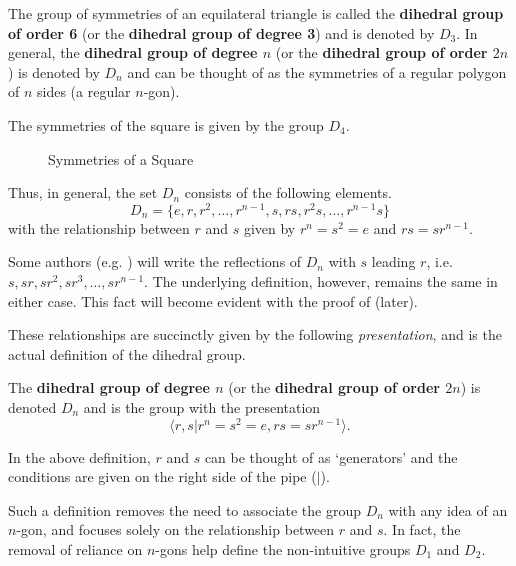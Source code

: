 The group of symmetries of an equilateral triangle is called the \textbf{dihedral group of order 6} (or the \textbf{dihedral group of degree 3}) and is denoted by $D_3$. In general, the \textbf{dihedral group of degree $n$} (or the \textbf{dihedral group of order $2n$}) is denoted by $D_n$ and can be thought of as the symmetries of a regular polygon of $n$ sides (a regular $n$-gon).

\begin{example}
    The symmetries of the square is given by the group $D_4$.
\end{example} 
\begin{figure}[h]
    \centering
    \caption{Symmetries of a Square}
\end{figure}

\newpage

Thus, in general, the set $D_n$ consists of the following elements.
\[
    D_n = \{e, r, r^2, \dots, r^{n-1}, s, rs, r^2s, \dots, r^{n-1}s\}
\]
with the relationship between $r$ and $s$ given by $r^n = s^2 = e$ and $rs = sr^{n-1}$.

\begin{remark}
    Some authors (e.g. \cite{humphreys_1996}) will write the reflections of $D_n$ with $s$ leading $r$, i.e. $s, sr, sr^2, sr^3, \dots, sr^{n-1}$. The underlying definition, however, remains the same in either case. This fact will become evident with the proof of  (later).
\end{remark}

These relationships are succinctly given by the following \textit{presentation}, and is the actual definition of the dihedral group.
\begin{definition}
    The \textbf{dihedral group of degree $n$} (or the \textbf{dihedral group of order $2n$}) is denoted $D_n$ and is the group with the presentation
    \[
        \langle r, s \vert r^n = s^2 = e, rs = sr^{n-1} \rangle.
    \]
\end{definition}
\begin{remark}
    In the above definition, $r$ and $s$ can be thought of as `generators' and the conditions are given on the right side of the pipe ($|$).
\end{remark}
Such a definition removes the need to associate the group $D_n$ with any idea of an $n$-gon, and focuses solely on the relationship between $r$ and $s$. In fact, the removal of reliance on $n$-gons help define the non-intuitive groups $D_1$ and $D_2$.

